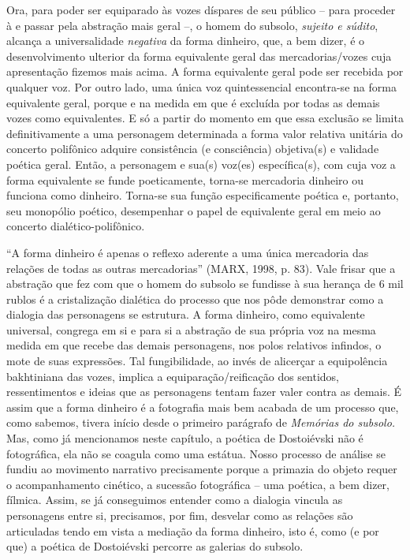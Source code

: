 Ora, para poder ser equiparado às vozes díspares de seu público -- para
proceder à e passar pela abstração mais geral --, o homem do subsolo,
\emph{sujeito e súdito}, alcança a universalidade \emph{negativa} da
forma dinheiro, que, a bem dizer, é o desenvolvimento ulterior da forma
equivalente geral das mercadorias/vozes cuja apresentação fizemos mais
acima. A forma equivalente geral pode ser recebida por qualquer voz. Por
outro lado, uma única voz quintessencial encontra-se na forma
equivalente geral, porque e na medida em que é excluída por todas as
demais vozes como equivalentes. E só a partir do momento em que essa
exclusão se limita definitivamente a uma personagem determinada a forma
valor relativa unitária do concerto polifônico adquire consistência (e
consciência) objetiva(s) e validade poética geral. Então, a personagem e
sua(s) voz(es) específica(s), com cuja voz a forma equivalente se funde
poeticamente, torna-se mercadoria dinheiro ou funciona como dinheiro.
Torna-se sua função especificamente poética e, portanto, seu monopólio
poético, desempenhar o papel de equivalente geral em meio ao concerto
dialético-polifônico.

``A forma dinheiro é apenas o reflexo aderente a uma única mercadoria
das relações de todas as outras mercadorias'' (MARX, 1998, p. 83). Vale
frisar que a abstração que fez com que o homem do subsolo se fundisse à
sua herança de 6 mil rublos é a cristalização dialética do processo que
nos pôde demonstrar como a dialogia das personagens se estrutura. A
forma dinheiro, como equivalente universal, congrega em si e para si a
abstração de sua própria voz na mesma medida em que recebe das demais
personagens, nos polos relativos infindos, o mote de suas expressões.
Tal fungibilidade, ao invés de alicerçar a equipolência bakhtiniana das
vozes, implica a equiparação/reificação dos sentidos, ressentimentos e
ideias que as personagens tentam fazer valer contra as demais. É assim
que a forma dinheiro é a fotografia mais bem acabada de um processo que,
como sabemos, tivera início desde o primeiro parágrafo de \emph{Memórias
do subsolo.} Mas, como já mencionamos neste capítulo, a poética de
Dostoiévski não é fotográfica, ela não se coagula como uma estátua.
Nosso processo de análise se fundiu ao movimento narrativo precisamente
porque a primazia do objeto requer o acompanhamento cinético, a sucessão
fotográfica -- uma poética, a bem dizer, fílmica. Assim, se já
conseguimos entender como a dialogia vincula as personagens entre si,
precisamos, por fim, desvelar como as relações são articuladas tendo em
vista a mediação da forma dinheiro, isto é, como (e por que) a poética
de Dostoiévski percorre as galerias do subsolo.

